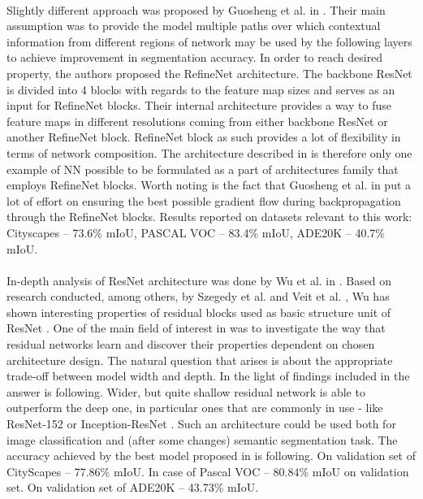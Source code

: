 \documentclass{article}
\begin{document}
\paragraph{}
Slightly different approach was proposed by Guosheng et al. in \cite{refinenet}. Their main assumption was to provide the model multiple paths over which contextual information from different regions of network may be used by the following layers to achieve improvement in segmentation accuracy. In order to reach desired property, the authors proposed the RefineNet architecture. The backbone ResNet \cite{resnet} is divided into 4 blocks with regards to the feature map sizes and serves as an input for RefineNet blocks. Their internal architecture provides a way to fuse feature maps in different resolutions coming from either backbone ResNet or another RefineNet block. RefineNet block as such provides a lot of flexibility in terms of network composition. The architecture described in \cite{refinenet} is therefore only one example of NN possible to be formulated as a part of architectures family that employs RefineNet blocks. Worth noting is the fact that Guosheng et al. in \cite{refinenet} put a lot of effort on ensuring the best possible gradient flow during backpropagation through the RefineNet blocks. Results reported on datasets relevant to this work: Cityscapes \cite{cityscapes} -- 73.6\% mIoU, PASCAL VOC \cite{pascal_voc} -- 83.4\% mIoU, ADE20K \cite{ade20k} -- 40.7\% mIoU.
\paragraph{}
In-depth analysis of ResNet \cite{resnet} architecture was done by Wu et al. in \cite{resnet-revisited}. Based on research conducted, among others, by Szegedy et al. \cite{inception-resnet} and Veit et al. \cite{resnet-enseble}, Wu has shown interesting properties of residual blocks used as basic structure unit of ResNet \cite{resnet}. One of the main field of interest in \cite{resnet-revisited} was to investigate the way that residual networks learn and discover their properties dependent on chosen architecture design. The natural question that arises is about the appropriate trade-off between model width and depth. In the light of findings included in \cite{resnet-revisited} the answer is following. Wider, but quite shallow residual network is able to outperform the deep one, in particular ones that are commonly in use - like ResNet-152 \cite{resnet} or Inception-ResNet \cite{inception-resnet}. Such an architecture could be used both for image classification and (after some changes) semantic segmentation task. The accuracy achieved by the best model proposed in \cite{resnet-revisited} is following. On validation set of CityScapes \cite{cityscapes} -- 77.86\% mIoU. In case of Pascal VOC \cite{pascal_voc} -- 80.84\% mIoU on validation set. On validation set of ADE20K \cite{ade20k} -- 43.73\% mIoU.
\end{document}

